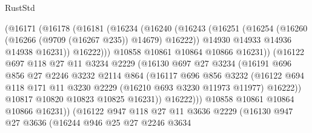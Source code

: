 \begin{lexlean}{RustStd}
\begin{coremodule}
                      (@16171
                        (@16178
                          (@16181
                            (@16234
                              (@16240
                                (@16243
                                  (@16251
                                    (@16254 (@16260 (@16266 (@9709 (@16267 @235)) @14679) @16222))
                                    @14930
                                    @14933
                                    @14936
                                    @14938
                                    @16231))
                                @16222)))
                          @10858
                          @10861
                          @10864
                          @10866
                          @16231))
                      (@16122
                        @697
                        @118
                        @27
                        @11
                        @3234
                        @2229
                        (@16130
                          @697
                          @27
                          @3234
                          (@16191
                            @696
                            @856
                            @27
                            @2246
                            @3232
                            @2114
                            @864
                            (@16117
                              @696
                              @856
                              @3232
                              (@16122
                                @694
                                @118
                                @171
                                @11
                                @3230
                                @2229
                                (@16210 @693 @3230 @11973 @11977)
                                @16222))
                            @10817
                            @10820
                            @10823
                            @10825
                            @16231))
                        @16222)))
                  @10858
                  @10861
                  @10864
                  @10866
                  @16231))
              (@16122
                @947
                @118
                @27
                @11
                @3636
                @2229
                (@16130
                  @947
                  @27
                  @3636
                  (@16244
                    @946
                    @25
                    @27
                    @2246
                    @3634

\end{coremodule}
\end{lexlean}
